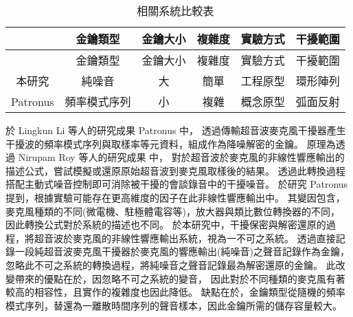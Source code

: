 \begin{longtable}{|c|c|c|c|c|c|}
    \caption{相關系統比較表}\label{table:comparison} \\
    \hline
    & 金鑰類型 & 金鑰大小 & 複雜度 & 實驗方式 & 干擾範圍 \\
    \hline
    \endfirsthead

    & 金鑰類型 & 金鑰大小 & 複雜度 & 實驗方式 & 干擾範圍 \\
    \hline
    \endhead

    \hline
    \endfoot

    \hline
    \endlastfoot

    本研究 &
    純噪音 &
    大 &
    簡單 &
    工程原型 &
    環形陣列 \\

    \hline

    Patronus\cite{li2020patronus} &
    頻率模式序列 &
    小 &
    複雜 &
    概念原型 &
    弧面反射 \\

\end{longtable}

    於 Lingkun Li 等人的研究成果 Patronus 中，
透過傳輸超音波麥克風干擾器產生干擾波的頻率模式序列與取樣率等元資料，組成作為降噪解密的金鑰。
原理為透過 Nirupam Roy 等人的研究成果 \cite{roy2017backdoor}\cite{roy2018inaudible} 中，
對於超音波於麥克風的非線性響應輸出的描述公式，嘗試模擬或還原原始超音波到麥克風取樣後的結果。
透過此轉換過程搭配主動式噪音控制即可消除被干擾的會談錄音中的干擾噪音。
於研究 Patronus 提到，根據實驗可能存在更高維度的因子在此非線性響應輸出中。
其變因包含，麥克風種類的不同(微電機、駐極體電容等)，放大器與類比數位轉換器的不同，
因此轉換公式對於系統的描述也不同。
於本研究中，干擾保密與解密還原的過程，將超音波於麥克風的非線性響應輸出系統，視為一不可之系統。
透過直接記錄一段純超音波麥克風干擾器於麥克風的響應輸出(純噪音)之聲音記錄作為金鑰，
忽略此不可之系統的轉換過程，將純噪音之聲音記錄最為解密還原的金鑰。
此改變帶來的優點在於，因忽略不可之系統的變音，
因此對於不同種類的麥克風有著較高的相容性，且實作的複雜度也因此降低。
缺點在於，金鑰類型從隨機的頻率模式序列，替還為一離散時間序列的聲音樣本，因此金鑰所需的儲存容量較大。
